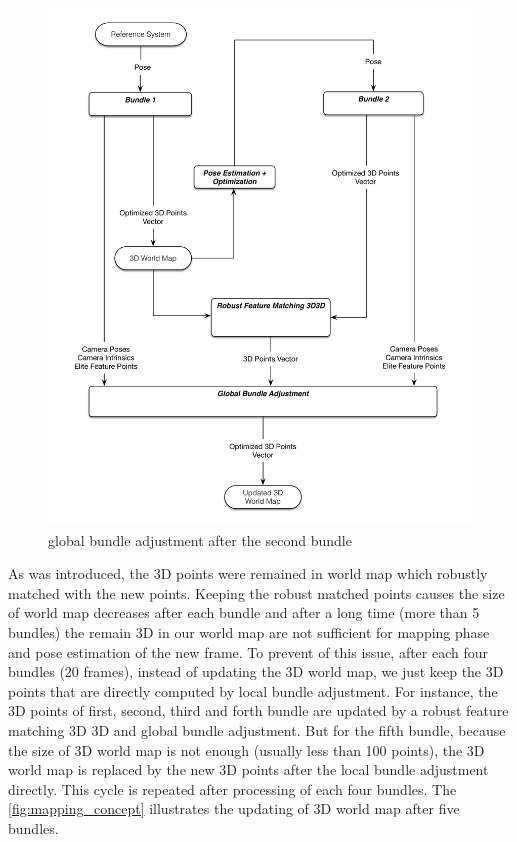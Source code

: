 \begin{figure}[H]
  \centering
  \includegraphics[width=120mm]{figures/global_bundle_adjustment}
  \caption{global bundle adjustment after the second bundle}\label{fig:global_bundle_adjustment}
\end{figure}

As was introduced, the 3D points were remained in world map which robustly matched with the new points. Keeping the robust matched points causes the size of world map decreases after each bundle and after a long time (more than 5 bundles) the remain 3D in our world map are not sufficient for mapping phase and pose estimation of the new frame. To prevent of this issue, after each four bundles (20 frames), instead of updating the 3D world map, we just keep the 3D points that are directly computed by local bundle adjustment. For instance, the 3D points of first, second, third and forth bundle are updated by a robust feature matching 3D 3D and global bundle adjustment. But for the fifth bundle, because the size of 3D world map is not enough (usually less than 100 points), the 3D world map is replaced by the new 3D points after the local bundle adjustment directly. This cycle is repeated after processing of each four bundles. The \autoref{fig:mapping_concept} illustrates the updating of 3D world map after five bundles.

